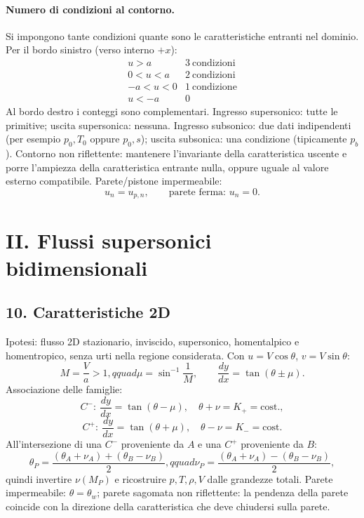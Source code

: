 \documentclass[11pt,a4paper]{article}
\begin{document}
\paragraph*{Numero di condizioni al contorno.}
Si impongono tante condizioni quante sono le caratteristiche entranti nel dominio.
Per il bordo sinistro (verso interno $+x$):
\[
\begin{array}{c|c}
u>a&3\ \text{condizioni}\\
0<u<a&2\ \text{condizioni}\\
-a<u<0&1\ \text{condizione}\\
u<-a&0
\end{array}
\]
Al bordo destro i conteggi sono complementari. Ingresso supersonico: tutte le primitive;
uscita supersonica: nessuna. Ingresso subsonico: due dati indipendenti (per esempio
$p_0,T_0$ oppure $p_0,s$); uscita subsonica: una condizione (tipicamente $p_b$).
Contorno non riflettente: mantenere l'invariante della caratteristica uscente e porre
l'ampiezza della caratteristica entrante nulla, oppure uguale al valore esterno compatibile.
Parete/pistone impermeabile:
\[
u_n=u_{p,n},\qquad \text{parete ferma: }u_n=0.
\]

\section*{II. Flussi supersonici bidimensionali}

\subsection*{10. Caratteristiche 2D}

Ipotesi: flusso 2D stazionario, inviscido, supersonico, homentalpico e homentropico,
senza urti nella regione considerata. Con $u=V\cos\theta$, $v=V\sin\theta$:
\[
M=\frac{V}{a}>1,qquad \mu=\sin^{-1}\frac1M,
\qquad \frac{dy}{dx}=\tan(\theta\pm\mu).
\]
Associazione delle famiglie:
\[
C^-:\ \frac{dy}{dx}=\tan(\theta-\mu),\quad \theta+\nu=K_+=\text{cost.},
\]
\[
C^+:\ \frac{dy}{dx}=\tan(\theta+\mu),\quad \theta-\nu=K_-=\text{cost.}
\]
All'intersezione di una $C^-$ proveniente da $A$ e una $C^+$ proveniente da $B$:
\[
\theta_P=\frac{(\theta_A+\nu_A)+(\theta_B-\nu_B)}2,qquad
\nu_P=\frac{(\theta_A+\nu_A)-(\theta_B-\nu_B)}2,
\]
quindi invertire $\nu(M_P)$ e ricostruire $p,T,\rho,V$ dalle grandezze totali.
Parete impermeabile: $\theta=\theta_w$; parete sagomata non riflettente: la pendenza
della parete coincide con la direzione della caratteristica che deve chiudersi sulla parete.
\end{document}
